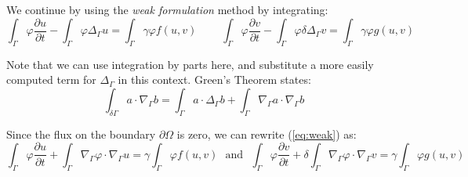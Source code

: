 \documentclass[12pt]{article}
\begin{document}
We continue by using the \textit{weak formulation} method by integrating: %
\begin{equation}\label{eq:weak}
\int_\Gamma \varphi\frac{\partial u}{\partial t} - \int_\Gamma \varphi\Delta_\Gamma u = \int_\Gamma \gamma\varphi f(u,v) ~~~~~~~~~~
\int_\Gamma \varphi\frac{\partial v}{\partial t} - \int_\Gamma \varphi\delta\Delta_\Gamma v = \int_\Gamma \gamma\varphi g(u,v)
\end{equation}


Note that we can use integration by parts here, and substitute a more easily computed term for $\Delta_\Gamma$ in this context. Green's Theorem states:
\begin{equation}
\int_{\delta\Gamma} a\cdot\nabla_\Gamma b =  \int_\Gamma a\cdot\Delta_\Gamma b + \int_\Gamma \nabla_\Gamma a \cdot \nabla_\Gamma b
\end{equation}

\noindent Since the flux on the boundary $\partial\Omega$ is zero, we can rewrite (\ref{eq:weak}) as:
\begin{equation}\label{eq:weak2}
\int_\Gamma \varphi\frac{\partial u}{\partial t} + \int_\Gamma \nabla_\Gamma\varphi\cdot\nabla_\Gamma u = \gamma\int_\Gamma \varphi f(u,v) ~~~\text{and}~~~
\int_\Gamma \varphi\frac{\partial v}{\partial t} + \delta\int_\Gamma \nabla_\Gamma\varphi\cdot\nabla_\Gamma v = \gamma\int_\Gamma \varphi g(u,v)
\end{equation}
\end{document}
